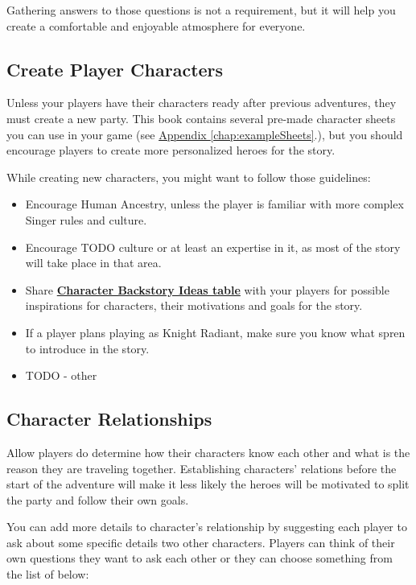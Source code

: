Gathering answers to those questions is not a requirement, but it will help you create a comfortable and enjoyable atmosphere for everyone.


\subsection{Create Player Characters}

Unless your players have their characters ready after previous adventures, they must create a new party. This book contains several pre-made character sheets you can use in your game (see \hyperref[chap:exampleSheets]{Appendix \ref{chap:exampleSheets}}.), but you should encourage players to create more personalized heroes for the story.

While creating new characters, you might want to follow those guidelines:
\begin{itemize}
	\item Encourage Human Ancestry, unless the player is familiar with more complex Singer rules and culture.
	\item Encourage TODO culture or at least an expertise in it, as most of the story will take place in that area.
	\item Share \hyperref[backstoryIdeas]{\textbf{Character Backstory Ideas table}} with your players for possible inspirations for characters, their motivations and goals for the story.
	\item If a player plans playing as Knight Radiant, make sure you know what spren to introduce in the story.
	\item TODO - other
\end{itemize}

\subsection{Character Relationships}

Allow players do determine how their characters know each other and what is the reason they are traveling together. Establishing characters’ relations before the start of the adventure will make it less likely the heroes will be motivated to split the party and follow their own goals.

You can add more details to character’s relationship by suggesting each player to ask about some specific details two other characters. Players can think of their own questions they want to ask each other or they can choose something from the list of below:

